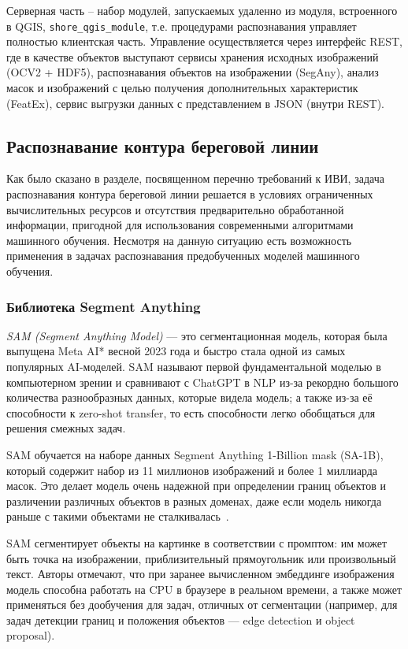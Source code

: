 \documentclass[732,fontsize=14pt,final]{studrep}
\begin{document}
Серверная часть -- набор модулей, запускаемых удаленно из модуля, встроенного в QGIS, \verb|shore_qgis_module|, т.е. процедурами распознавания управляет полностью   клиентская часть. Управление осуществляется через интерфейс REST, где в качестве объектов выступают сервисы хранения исходных изображений (OCV2 + HDF5), распознавания объектов на изображении (SegAny), анализ масок и изображений с целью получения дополнительных характеристик (FeatEx), сервис выгрузки данных с представлением в JSON (внутри REST).

\subsection{Распознавание контура береговой линии}

Как было сказано в разделе, посвященном перечню требований к ИВИ, задача распознавания контура береговой линии решается в условиях ограниченных вычислительных ресурсов и отсутствия предварительно обработанной информации, пригодной для использования современными алгоритмами машинного обучения. Несмотря на данную ситуацию есть возможность применения в задачах распознавания предобученных моделей машинного обучения. 

\subsubsection{Библиотека Segment Anything}
\label{sec:sam}

\emph{SAM (Segment Anything Model)} — это сегментационная модель, которая была выпущена Meta AI*  весной 2023 года и быстро стала одной из самых популярных AI-моделей. SAM называют первой фундаментальной моделью в компьютерном зрении и сравнивают с ChatGPT в NLP из-за рекордно большого количества разнообразных данных, которые видела модель; а также из-за её способности к zero-shot transfer, то есть способности легко обобщаться для решения смежных задач.

SAM обучается на наборе данных Segment Anything 1-Billion mask (SA-1B), который содержит набор из 11 миллионов изображений и более 1 миллиарда масок. Это делает модель очень надежной при определении границ объектов и различении различных объектов в разных доменах, даже если модель никогда раньше с такими объектами не сталкивалась~\cite{samart}.

SAM сегментирует объекты на картинке в соответствии с промптом: им может быть точка на изображении, приблизительный прямоугольник или произвольный текст. Авторы отмечают, что при заранее вычисленном эмбеддинге изображения модель способна работать на CPU в браузере в реальном времени, а также может применяться без дообучения для задач, отличных от сегментации (например, для задач детекции границ и положения объектов — edge detection и object proposal).
\end{document}
